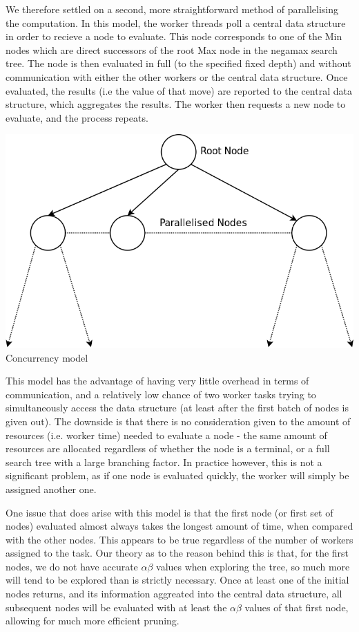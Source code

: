 \documentclass[10pt]{report}
\begin{document}
\begin{multicols}{2}
We therefore settled on a second, more straightforward method of parallelising the computation. In this model, the worker threads poll a central data structure in order to recieve a node to evaluate. This node corresponds to one of the Min nodes which are direct successors of the root Max node in the negamax search tree. The node is then evaluated in full (to the specified fixed depth) and without communication with either the other workers or the central data structure. Once evaluated, the results (i.e the value of that move) are reported to the central data structure, which aggregates the results. The worker then requests a new node to evaluate, and the process repeats.

\begin{center}
\includegraphics[scale=0.31]{concurrency.png}
\\Concurrency model
\end{center}

This model has the advantage of having very little overhead in terms of communication, and a relatively low chance of two worker tasks trying to simultaneously access the data structure (at least after the first batch of nodes is given out). The downside is that there is no consideration given to the amount of resources (i.e. worker time) needed to evaluate a node - the same amount of resources are allocated regardless of whether the node is a terminal, or a full search tree with a large branching factor. In practice however, this is not a significant problem, as if one node is evaluated quickly, the worker will simply be assigned another one.

One issue that does arise with this model is that the first node (or first set of nodes) evaluated almost always takes the longest amount of time, when compared with the other nodes. This appears to be true regardless of the number of workers assigned to the task. Our theory as to the reason behind this is that, for the first nodes, we do not have accurate $\alpha\beta$ values when exploring the tree, so much more will tend to be explored than is strictly necessary. Once at least one of the initial nodes returns, and its information aggreated into the central data structure, all subsequent nodes will be evaluated with at least the $\alpha\beta$ values of that first node, allowing for much more efficient pruning.


\end{multicols}
\end{document}
